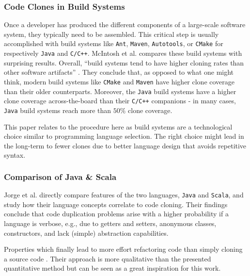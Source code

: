 \subsubsection{Code Clones in Build Systems}

Once a developer has produced the different components of a large-scale software system, they typically need to be assembled. This critical step is usually accomplished with build systems like \texttt{Ant},  \texttt{Maven}, \texttt{Autotools}, or \texttt{CMake} for respectively \texttt{Java} and \texttt{C/C++}. McIntosh et al. \cite{mcintosh2014collecting} compares these build systems with surprising results. Overall, ``build systems tend to have higher cloning rates than other software artifacts'' \cite{mcintosh2014collecting}. They conclude that, as opposed to what one might think, modern build systems like \texttt{CMake} and  \texttt{Maven} have higher clone coverage than their older counterparts. Moreover, the \texttt{Java} build systems have a higher clone coverage across-the-board than their \texttt{C/C++} companions - in many cases, \texttt{Java} build systems reach more than $50\%$ clone coverage.

This paper relates to the procedure here as build systems are a technological choice similar to programming language selection. The right choice might lead in the long-term to fewer clones due to better language design that avoids repetitive syntax.

\subsubsection{Comparison of Java \& Scala}

Jorge et al. \cite{jorge2012impact} directly compare features of the two languages, \texttt{Java} and \texttt{Scala}, and study how their language concepts correlate to code cloning. Their findings conclude that code duplication problems arise with a higher probability if a language is verbose, e.g., due to getters and setters, anonymous classes, constructors, and lack (simple) abstraction capabilities. 

Properties which finally lead to more effort refactoring code than simply cloning a source code \cite{jorge2012impact}.
Their approach is more qualitative than the presented quantitative method but can be seen as a great inspiration for this work.
